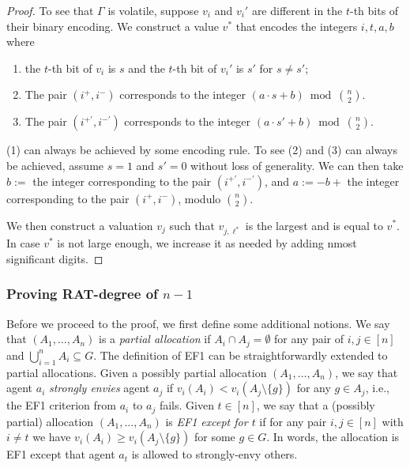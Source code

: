 \begin{proof}
    To see that $\Gamma$ is volatile, suppose $v_i$ and $v_i'$ are different in the $t$-th bits of their binary encoding.
    We construct a value $v^*$ that encodes the integers
    $i,t,a,b$ where
    \begin{enumerate}
        \item the $t$-th bit of $v_{i}$ is $s$ and the $t$-th bit of $v_{i}'$ is $s'$ for $s\neq s'$;
        \item The pair $(i^+,i^-)$ corresponds to the integer $(a\cdot s + b) \bmod {n \choose 2}$.
        \item The pair $(i^{+'},i^{-'})$ corresponds to the integer $(a\cdot s' + b) \bmod {n \choose 2}$.
    \end{enumerate}
    (1) can always be achieved by some encoding rule.
    To see (2) and (3) can always be achieved, assume $s=1$ and $s'=0$ without loss of generality.
We can then take $b := $ the integer corresponding to the pair $(i^{+'},i^{-'})$, and $a := - b + $ the integer corresponding to the pair $(i^{+},i^{-})$, modulo ${n\choose 2}$.
    
    
    We then construct a valuation $v_j$ such that $v_{j,\ell^\ast}$ is the largest and is equal to $v^*$.
    In case $v^*$ is not large enough, we increase it as needed by adding nmost significant digits.
\end{proof}

\subsubsection{Proving RAT-degree of $n-1$}
Before we proceed to the proof, we first define some additional notions.
We say that $(A_1,\ldots,A_n)$ is a \emph{partial allocation} if $A_i\cap A_j=\emptyset$ for any pair of $i,j\in[n]$ and $\bigcup_{i=1}^nA_i\subseteq G$.
The definition of EF1 can be straightforwardly extended to partial allocations.
Given a possibly partial allocation $(A_1,\ldots,A_n)$, we say that agent $a_i$ \emph{strongly envies} agent $a_j$ if $v_i(A_i)<v_i(A_j\setminus\{g\})$ for any $g\in A_j$, i.e., the EF1 criterion from $a_i$ to $a_j$ fails.
Given $t \in[n]$, we say that a (possibly partial) allocation $(A_1,\ldots,A_n)$ is \emph{EF1 except for $t$} if for any pair $i,j\in[n]$ with $i\neq t$ we have $v_i(A_i)\geq v_i(A_j\setminus \{g\})$ for some $g\in G$.
In words, the allocation is EF1 except that agent $a_t$ is allowed to strongly-envy others.

